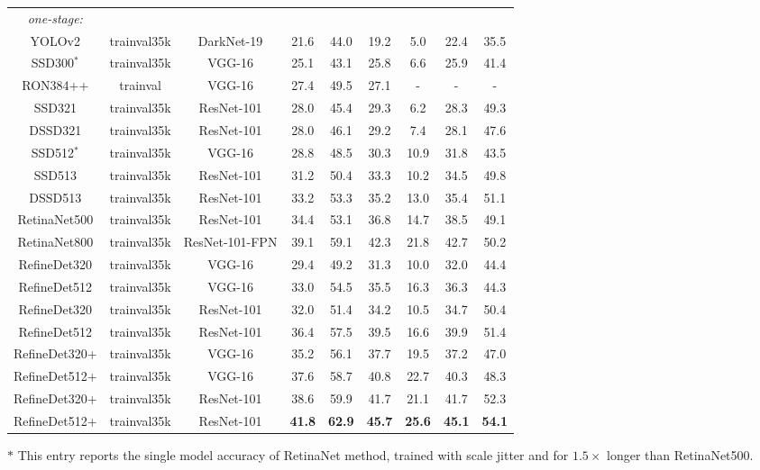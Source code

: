 \documentclass[10pt,twocolumn,letterpaper]{article}
\begin{document}
\begin{table*}[t]
\begin{threeparttable}
\begin{tabular}{c|c|c|ccc|ccc}
\hline
\hline
\textit{one-stage:} & & & & & & & & \\
YOLOv2 \cite{DBLP:journals/corr/RedmonF16} &trainval35k &DarkNet-19\cite{DBLP:journals/corr/RedmonF16} &21.6 &44.0 &19.2 &5.0 &22.4 &35.5\\
SSD300$^*$ \cite{DBLP:conf/eccv/LiuAESRFB16} &trainval35k &VGG-16 &25.1 &43.1 &25.8 &6.6 &25.9 &41.4\\
RON384++ \cite{DBLP:conf/cvpr/KongSYLLC17} &trainval &VGG-16 &27.4 &49.5 &27.1 &- &- &- \\
SSD321 \cite{DBLP:journals/corr/FuLRTB17} &trainval35k &ResNet-101 &28.0 &45.4 &29.3 &6.2 &28.3 &49.3\\
DSSD321 \cite{DBLP:journals/corr/FuLRTB17} &trainval35k &ResNet-101 &28.0 &46.1 &29.2 &7.4 &28.1 &47.6\\
SSD512$^*$ \cite{DBLP:conf/eccv/LiuAESRFB16} &trainval35k &VGG-16 &28.8 &48.5 &30.3 &10.9 &31.8 &43.5\\
SSD513 \cite{DBLP:journals/corr/FuLRTB17} &trainval35k &ResNet-101 &31.2 &50.4 &33.3 &10.2 &34.5 &49.8 \\
DSSD513 \cite{DBLP:journals/corr/FuLRTB17} &trainval35k &ResNet-101 &33.2 &53.3 &35.2 &13.0 &35.4 &51.1 \\
RetinaNet500 \cite{DBLP:conf/iccv/LinPRK17} &trainval35k &ResNet-101 &34.4 &53.1 &36.8 &14.7 &38.5 &49.1 \\
RetinaNet800 \cite{DBLP:conf/iccv/LinPRK17}\tnote{$\bm{\ast}$} &trainval35k &ResNet-101-FPN &39.1 &59.1 &42.3 &21.8 &42.7 &50.2 \\
\hline
RefineDet320  &trainval35k &VGG-16 &29.4 &49.2 &31.3 &10.0 &32.0 &44.4\\
RefineDet512  &trainval35k &VGG-16 &33.0 &54.5 &35.5 &16.3 &36.3 &44.3 \\
RefineDet320  &trainval35k &ResNet-101 &32.0 &51.4 &34.2 &10.5 &34.7 &50.4 \\
RefineDet512  &trainval35k &ResNet-101 &36.4 &57.5 &39.5 &16.6 &39.9 &51.4 \\
RefineDet320+ &trainval35k &VGG-16 &35.2 &56.1 &37.7 &19.5 &37.2 &47.0 \\
RefineDet512+ &trainval35k &VGG-16 &37.6 &58.7 &40.8 &22.7 &40.3 &48.3\\
RefineDet320+ &trainval35k &ResNet-101 &38.6 &59.9 &41.7 &21.1 &41.7 &52.3 \\
RefineDet512+ &trainval35k &ResNet-101 &{\bf 41.8} &{\bf 62.9} &{\bf 45.7} &{\bf 25.6} &{\bf 45.1} &{\bf 54.1} \\
\bottomrule[1.5pt]
\end{tabular}
\begin{tablenotes}
\item[$\bm{\ast}$] This entry reports the single model accuracy of RetinaNet method, trained with scale jitter and for $1.5\times$ longer than RetinaNet500.
\end{tablenotes}
\end{threeparttable}
\label{tab:coco}
\end{table*}
\end{document}
